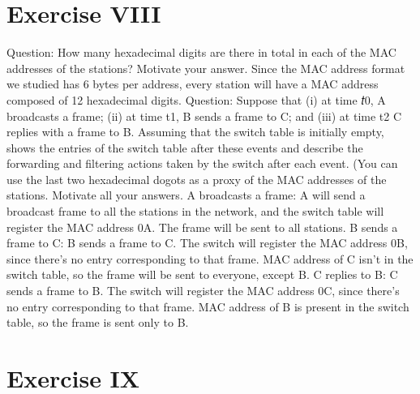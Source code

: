 \documentclass[11pt]{article}
\begin{document}
	\section*{Exercise VIII}
	Question:
	How many hexadecimal digits are there in total in each of the MAC addresses of the stations? Motivate your answer.
	Since the MAC address format we studied has 6 bytes per address, every station will have a MAC address composed of 12 hexadecimal digits.
	Question:
	Suppose that (i) at time 𝑡0, A broadcasts a frame; (ii) at time t1, B sends a frame to C; and (iii) at time t2 C replies with a frame to B. Assuming that the switch table is initially empty, shows the entries of the switch table after these events and describe the forwarding and filtering actions taken by the switch after each event. (You can use the last two hexadecimal dogots as a proxy of the MAC addresses of the stations. Motivate all your answers.
	A broadcasts a frame: A will send a broadcast frame to all the stations in the network, and the switch table will register the MAC address 0A. The frame will be sent to all stations.
	B sends a frame to C: B sends a frame to C. The switch will register the MAC address 0B, since there's no entry corresponding to that frame. MAC address of C isn't in the switch table, so the frame will be sent to everyone, except B.
	C replies to B: C sends a frame to B. The switch will register the MAC address 0C, since there's no entry corresponding to that frame. MAC address of B is present in the switch table, so the frame is sent only to B.
	\section*{Exercise IX}
\end{document}
